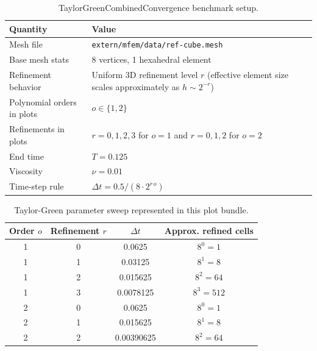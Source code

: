\documentclass[11pt]{article}
\begin{document}
\begin{table}[H]
	\centering
	\begin{tabularx}{\textwidth}{@{}lX@{}}
		\toprule
		Quantity                   & Value                                                                                            \\
		\midrule
		Mesh file                  & \texttt{extern/mfem/data/ref-cube.mesh}                                                          \\
		Base mesh stats            & 8 vertices, 1 hexahedral element                                                                 \\
		Refinement behavior        & Uniform 3D refinement level $r$ (effective element size scales approximately as $h \sim 2^{-r}$) \\
		Polynomial orders in plots & $o \in \{1,2\}$                                                                                  \\
		Refinements in plots       & $r=0,1,2,3$ for $o=1$ and $r=0,1,2$ for $o=2$                                                    \\
		End time                   & $T=0.125$                                                                                        \\
		Viscosity                  & $\nu = 0.01$                                                                                     \\
		Time-step rule             & $\Delta t = 0.5 / \left(8\cdot 2^{r\,o}\right)$                                                  \\
		\bottomrule
	\end{tabularx}
	\caption{TaylorGreenCombinedConvergence benchmark setup.}
\end{table}

\begin{table}[H]
	\centering
	\begin{tabular}{@{}cccc@{}}
		\toprule
		Order $o$ & Refinement $r$ & $\Delta t$ & Approx. refined cells \\
		\midrule
		1         & 0              & 0.0625     & $8^0 = 1$             \\
		1         & 1              & 0.03125    & $8^1 = 8$             \\
		1         & 2              & 0.015625   & $8^2 = 64$            \\
		1         & 3              & 0.0078125  & $8^3 = 512$           \\
		2         & 0              & 0.0625     & $8^0 = 1$             \\
		2         & 1              & 0.015625   & $8^1 = 8$             \\
		2         & 2              & 0.00390625 & $8^2 = 64$            \\
		\bottomrule
	\end{tabular}
	\caption{Taylor-Green parameter sweep represented in this plot bundle.}
\end{table}
\end{document}
